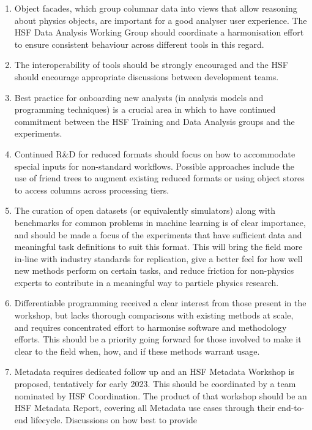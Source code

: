 \documentclass[a4paper,11pt]{article}
\begin{document}
\begin{enumerate}
\item
  Object facades, which group columnar data into views that allow
  reasoning about physics objects, are important for a good analyser
  user experience. The HSF Data Analysis Working Group should coordinate
  a harmonisation effort to ensure consistent behaviour across different
  tools in this regard.
\item
  The interoperability of tools should be strongly encouraged and the
  HSF should encourage appropriate discussions between development
  teams.
\item
  Best practice for onboarding new analysts (in analysis models and
  programming techniques) is a crucial area in which to have continued
  commitment between the HSF Training and Data Analysis groups and the
  experiments.
\item
  Continued R\&D for reduced formats should focus on how to accommodate
  special inputs for non-standard workflows. Possible approaches include
  the use of friend trees to augment existing reduced formats or using
  object stores to access columns across processing tiers.
\item
  The curation of open datasets (or equivalently simulators) along with
  benchmarks for common problems in machine learning is of clear
  importance, and should be made a focus of the experiments that have
  sufficient data and meaningful task definitions to suit this format.
  This will bring the field more in-line with industry standards for
  replication, give a better feel for how well new methods perform on
  certain tasks, and reduce friction for non-physics experts to
  contribute in a meaningful way to particle physics research.
\item
  Differentiable programming received a clear interest from those
  present in the workshop, but lacks thorough comparisons with existing
  methods at scale, and requires concentrated effort to harmonise
  software and methodology efforts. This should be a priority going
  forward for those involved to make it clear to the field when, how,
  and if these methods warrant usage.
\item
  Metadata requires dedicated follow up and an HSF Metadata Workshop is
  proposed, tentatively for early 2023. This should be coordinated by a
  team nominated by HSF Coordination. The product of that workshop
  should be an HSF Metadata Report, covering all Metadata use cases
  through their end-to-end lifecycle. Discussions on how best to provide

\end{enumerate}
\end{document}
